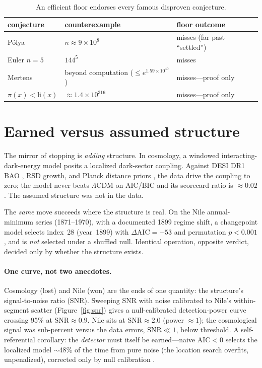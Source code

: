 \documentclass[11pt]{article}
\begin{document}
\begin{table}[h]\centering
\begin{tabular}{lll}
\toprule
conjecture & counterexample & floor outcome\\
\midrule
P\'olya & $n\approx9\times10^8$ \citep{tanaka1980} & misses (far past ``settled'')\\
Euler $n{=}5$ & $144^5$ \citep{lander1966} & misses\\
Mertens & beyond computation ($\le e^{1.59\times10^{40}}$) & misses---proof only\\
$\pi(x)<\mathrm{li}(x)$ & $\approx1.4\times10^{316}$ \citep{demichel2005} & misses---proof only\\
\bottomrule
\end{tabular}
\caption{An efficient floor endorses every famous disproven conjecture.}
\label{tab:hist}
\end{table}

\section{Earned versus assumed structure}\label{sec:earned}
The mirror of stopping is \emph{adding} structure. In cosmology, a windowed
interacting-dark-energy model posits a localized dark-sector coupling. Against DESI
DR1 BAO \citep{desi2024}, RSD growth, and Planck distance priors
\citep{chen2019}, the data drive the coupling to zero; the model never beats
$\Lambda$CDM on AIC/BIC \citep{akaike1974,schwarz1978} and its scorecard ratio is
$\approx0.02$. The assumed structure was not in the data.

The \emph{same} move succeeds where the structure is real. On the Nile
annual-minimum series (1871--1970), with a documented 1899 regime shift, a
changepoint model selects index~28 (year~1899) with $\Delta\mathrm{AIC}=-53$ and
permutation $p<0.001$, and is \emph{not} selected under a shuffled null. Identical
operation, opposite verdict, decided only by whether the structure exists.

\paragraph{One curve, not two anecdotes.} Cosmology (lost) and Nile (won) are the
ends of one quantity: the structure's signal-to-noise ratio (SNR). Sweeping SNR
with noise calibrated to Nile's within-segment scatter
(Figure~\ref{fig:snr}) gives a null-calibrated detection-power curve crossing 95\%
at $\mathrm{SNR}\approx0.9$. Nile sits at $\mathrm{SNR}\approx2.0$ (power $\approx1$);
the cosmological signal was sub-percent versus the data errors, $\mathrm{SNR}\ll1$,
below threshold. A self-referential corollary: the \emph{detector} must itself be
earned---naive AIC$<$0 selects the localized model $\sim$48\% of the time from pure
noise (the location search overfits, unpenalized), corrected only by null
calibration \citep{rissanen1978}.
\end{document}
